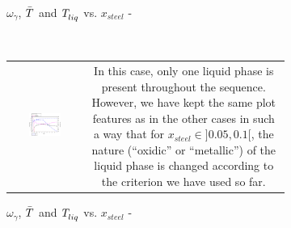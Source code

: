 \begin{figure}[H]
\begin{subfigure}[t]{0.48\textwidth}
\caption{$\omega_\gamma$, $\bar{\temperature{}}$ and $\temperature{liq}$ vs. $x_{steel}$ - } \label{fig:x-T_C32_1850_OpenCalphad_NUCLEA9_separatedLiquidEqs} 
\end{subfigure}
\\
\begin{subfigure}[t]{1.0\textwidth}
\begin{tabular}{cc}
   \includegraphics[width=0.48\textwidth]{figures/CalphadBasedEOSTest/OpenCalphad_NUCLEA9_eq_noLiquidSeparation/C32_1850_x-T.eps} 
 & \begin{minipage}[b]
{0.48\textwidth} In this case, only one liquid phase is present throughout the sequence. However, we have kept the same plot features as in the other cases in such a way that for $x_{steel} \in ]0.05, 0.1[$, the nature (``oxidic'' or ``metallic'') of the liquid phase is changed according to the criterion we have used so far. \end{minipage}
\end{tabular}
\caption{$\omega_\gamma$, $\bar{\temperature{}}$ and $\temperature{liq}$ vs. $x_{steel}$ - } \label{fig:x-T_C32_1850_OpenCalphad_NUCLEA9_eq_noLiquidSeparation} 
\end{subfigure}
\caption{}
\end{figure}

